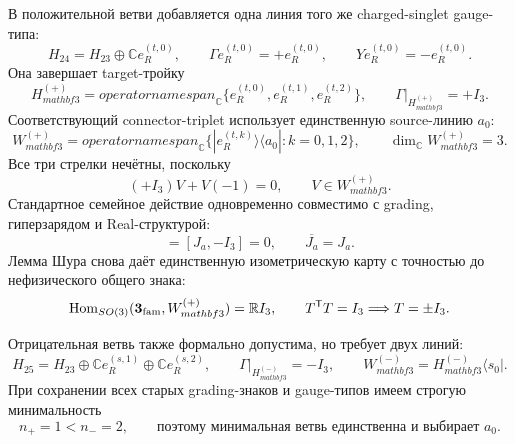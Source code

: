 В положительной ветви добавляется одна линия того же
charged-singlet gauge-типа:
\begin{equation}
 H_{24}=H_{23}\oplus\mathbb C e_R^{(t,0)},
 \qquad \Gamma e_R^{(t,0)}=+e_R^{(t,0)},
 \qquad Y e_R^{(t,0)}=-e_R^{(t,0)}.
 \label{eq:v8-baryon-c0-minimal-plus-target-extension}
\end{equation}
Она завершает target-тройку
\begin{equation}
 H_{mathbf3}^{(+)}=operatorname{span}_{\mathbb C}
 \{e_R^{(t,0)},e_R^{(t,1)},e_R^{(t,2)}\},
 \qquad \Gamma\big|_{H_{mathbf3}^{(+)}}=+I_3.
 \label{eq:v8-baryon-c0-plus-family-target-triplet}
\end{equation}
Соответствующий connector-triplet использует единственную source-линию
$a_0$:
\begin{equation}
 W_{mathbf3}^{(+)}=operatorname{span}_{\mathbb C}
 \{|e_R^{(t,k)}\rangle\langle a_0|:k=0,1,2\},
 \qquad \dim_{\mathbb C}W_{mathbf3}^{(+)}=3.
 \label{eq:v8-baryon-c0-plus-family-connector-triplet}
\end{equation}
Все три стрелки нечётны, поскольку
\begin{equation}
 (+I_3)V+V(-1)=0,
 \qquad V\in W_{mathbf3}^{(+)}.
 \label{eq:v8-baryon-c0-plus-triplet-oddness}
\end{equation}
Стандартное семейное действие одновременно совместимо с grading,
гиперзарядом и Real-структурой:
\begin{equation}
 [J_a,+I_3]=[J_a,-I_3]=0,
 \qquad \overline{J_a}=J_a.
 \label{eq:v8-baryon-c0-plus-triplet-structural-compatibility}
\end{equation}
Лемма Шура снова даёт единственную изометрическую карту с точностью до
нефизического общего знака:
\begin{equation}
 \operatorname{Hom}_{SO(3)}(\mathbf3_{\rm fam},W_{mathbf3}^{(+)})
 =\mathbb RI_3,
 \qquad T^{\mathsf T}T=I_3\Longrightarrow T=\pm I_3.
 \label{eq:v8-baryon-c0-plus-triplet-schur-map}
\end{equation}

Отрицательная ветвь также формально допустима, но требует двух линий:
\begin{equation}
 H_{25}=H_{23}\oplus\mathbb C e_R^{(s,1)}
 \oplus\mathbb C e_R^{(s,2)},
 \qquad \Gamma\big|_{H_{mathbf3}^{(-)}}=-I_3,
 \qquad W_{mathbf3}^{(-)}=H_{mathbf3}^{(-)}\langle s_0|.
 \label{eq:v8-baryon-c0-minus-family-triplet-branch}
\end{equation}
При сохранении всех старых grading-знаков и gauge-типов имеем строгую
минимальность
\begin{equation}
 n_+=1<n_-=2,
 \qquad \text{поэтому минимальная ветвь единственна и выбирает }a_0.
 \label{eq:v8-baryon-c0-minimal-branch-selects-a0}
\end{equation}

